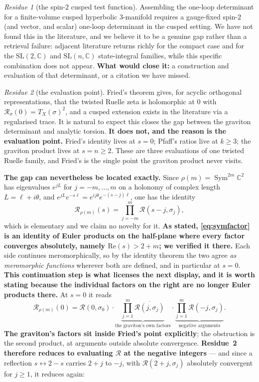 \documentclass[11pt,a4paper]{article}
\theoremstyle{definition}
\theoremstyle{remark}
\newtheorem{residue}{Residue}
\newcommand{\C}{\mathbb{C}}
\newcommand{\Sym}{\operatorname{Sym}}
\newcommand{\Rz}{\mathcal{R}}
\begin{document}
\begin{residue}[the spin-$2$ cusped test function]\label{res:one}
Assembling the one-loop determinant for a finite-volume cusped hyperbolic $3$-manifold requires
a gauge-fixed spin-$2$ (and vector, and scalar) one-loop determinant in the cusped setting. We
have not found this in the literature, and we believe it to be a genuine gap rather than a
retrieval failure: adjacent literature returns richly for the compact case and for the
$\mathrm{SL}(2,\C)$ and $\mathrm{SL}(n,\C)$ state-integral families, while this specific
combination does not appear. \textbf{What would close it:} a construction and evaluation of that
determinant, or a citation we have missed.
\end{residue}

\begin{residue}[the evaluation point]\label{res:two}
Fried's theorem gives, for acyclic orthogonal representations, that the twisted Ruelle zeta is
holomorphic at $0$ with $\Rz_\sigma(0)=T_X(\sigma)^2$, and a cusped extension exists in the
literature via a regularised trace. It is natural to expect this closes the gap between the
graviton determinant and analytic torsion. \textbf{It does not, and the reason is the evaluation
point.} Fried's identity lives at $s=0$; Pfaff's ratios live at $k\ge3$; the graviton product
lives at $s=n\ge2$. These are three evaluations of one twisted Ruelle family, and Fried's is the
single point the graviton product never visits.

\textbf{The gap can nevertheless be located exactly.} Since $\rho(m)=\Sym^{2m}\C^2$ has
eigenvalues $e^{jL}$ for $j=-m,\dots,m$ on a holonomy of complex length $L=\ell+i\theta$, and
$e^{jL}e^{-s\ell}=e^{ij\theta}e^{-(s-j)\ell}$, one has the identity
\begin{equation}\label{eq:symfactor}
   \Rz_{\rho(m)}(s)=\prod_{j=-m}^{m}\Rz(s-j,\sigma_j),
\end{equation}
which is elementary and we claim no novelty for it. \textbf{As stated,
\eqref{eq:symfactor} is an identity of Euler products on the half-plane where every factor
converges absolutely, namely $\mathrm{Re}(s)>2+m$; we verified it there.} Each side continues
meromorphically, so by the identity theorem the two agree \emph{as meromorphic functions} wherever
both are defined, and in particular at $s=0$. \textbf{This continuation step is what licenses the
next display, and it is worth stating because the individual factors on the right are no longer
Euler products there.} At $s=0$ it reads
\[
   \Rz_{\rho(m)}(0)=\Rz(0,\sigma_0)\cdot
   \underbrace{\prod_{j=1}^{m}\overline{\Rz(j,\sigma_j)}}_{\text{the graviton's own factors}}\cdot
   \underbrace{\prod_{j=1}^{m}\Rz(-j,\sigma_j)}_{\text{negative arguments}} .
\]
\textbf{The graviton's factors sit inside Fried's point explicitly}; the obstruction is the second
product, at arguments outside absolute convergence. \textbf{Residue~2 therefore reduces to
evaluating $\Rz$ at the negative integers} --- and since a reflection $s\leftrightarrow2-s$ carries
$2+j$ to $-j$, with $\Rz(2+j,\sigma_j)$ absolutely convergent for $j\ge1$, it reduces again:


\end{residue}
\end{document}
